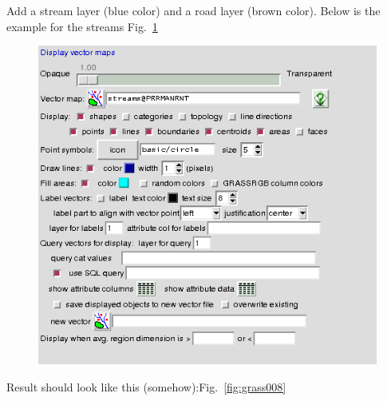 Add a stream layer (blue color) and a road layer (brown color). Below is
the example for the streams Fig.~\ref{fig:grass007}

\begin{figure}[htbp]
   \centering
   \includegraphics[scale=0.45]{grass007.png}
   \caption{}
   \label{fig:grass007}
\end{figure}

Result should look like this (somehow):Fig.~\ref{fig:grass008}

